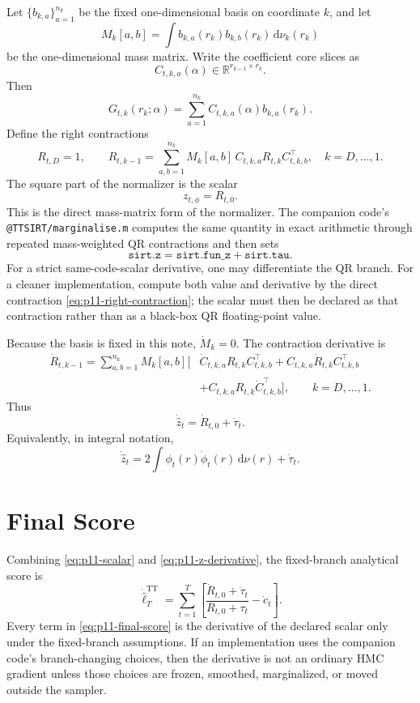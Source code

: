 \documentclass[11pt]{article}
\newcommand{\dd}{\mathrm{d}}
\newcommand{\R}{\mathbb{R}}
\newcommand{\TT}{\mathrm{TT}}
\begin{document}
Let \(\{b_{k,a}\}_{a=1}^{n_k}\) be the fixed one-dimensional basis on
coordinate \(k\), and let
\[
  M_k[a,b]=\int b_{k,a}(r_k)b_{k,b}(r_k)\,\dd\nu_k(r_k)
  \label{eq:p11-mass}
\]
be the one-dimensional mass matrix.  Write the coefficient core slices as
\[
  C_{t,k,a}(\alpha)\in\R^{r_{k-1}\times r_k}.
\]
Then
\[
  G_{t,k}(r_k;\alpha)=\sum_{a=1}^{n_k} C_{t,k,a}(\alpha)b_{k,a}(r_k).
\]
Define the right contractions
\[
  R_{t,D}=1,\qquad
  R_{t,k-1}
  =
  \sum_{a,b=1}^{n_k}
  M_k[a,b]\,
  C_{t,k,a} R_{t,k} C_{t,k,b}^\top,
  \quad k=D,\ldots,1.
  \label{eq:p11-right-contraction}
\]
The square part of the normalizer is the scalar
\[
  z_{t,\phi}=R_{t,0}.
  \label{eq:p11-zphi}
\]
This is the direct mass-matrix form of the normalizer.  The companion code's
\texttt{@TTSIRT/marginalise.m} computes the same quantity in exact arithmetic
through repeated mass-weighted QR contractions and then sets
\[
  \texttt{sirt.z}=\texttt{sirt.fun\_z}+\texttt{sirt.tau}.
\]
For a strict same-code-scalar derivative, one may differentiate the QR branch.
For a cleaner implementation, compute both value and derivative by the direct
contraction \eqref{eq:p11-right-contraction}; the scalar must then be declared
as that contraction rather than as a black-box QR floating-point value.

Because the basis is fixed in this note, \(\dot M_k=0\).  The contraction
derivative is
\[
\begin{aligned}
  \dot R_{t,k-1}
  =
  \sum_{a,b=1}^{n_k}M_k[a,b]\Big[
  &\dot C_{t,k,a}R_{t,k}C_{t,k,b}^\top
  +C_{t,k,a}\dot R_{t,k}C_{t,k,b}^\top \\
  &+C_{t,k,a}R_{t,k}\dot C_{t,k,b}^\top
  \Big],
  \qquad k=D,\ldots,1.
  \label{eq:p11-right-contraction-derivative}
\end{aligned}
\]
Thus
\[
  \dot{\widehat z}_t
  =
  \dot R_{t,0}+\dot\tau_t.
  \label{eq:p11-z-derivative}
\]
Equivalently, in integral notation,
\[
  \dot{\widehat z}_t
  =
  2\int \phi_t(r)\dot\phi_t(r)\,\dd\nu(r)+\dot\tau_t.
  \label{eq:p11-z-integral-derivative}
\]

\section{Final Score}

Combining \eqref{eq:p11-scalar} and \eqref{eq:p11-z-derivative}, the
fixed-branch analytical score is
\[
  \boxed{
  \dot{\widehat\ell}_T^{\TT}
  =
  \sum_{t=1}^T
  \left[
  \frac{\dot R_{t,0}+\dot\tau_t}
       {R_{t,0}+\tau_t}
  -
  \dot c_t
  \right].
  }
  \label{eq:p11-final-score}
\]
Every term in \eqref{eq:p11-final-score} is the derivative of the declared
scalar only under the fixed-branch assumptions.  If an implementation uses
the companion code's branch-changing choices, then the derivative is not an
ordinary HMC gradient unless those choices are frozen, smoothed, marginalized,
or moved outside the sampler.
\end{document}
